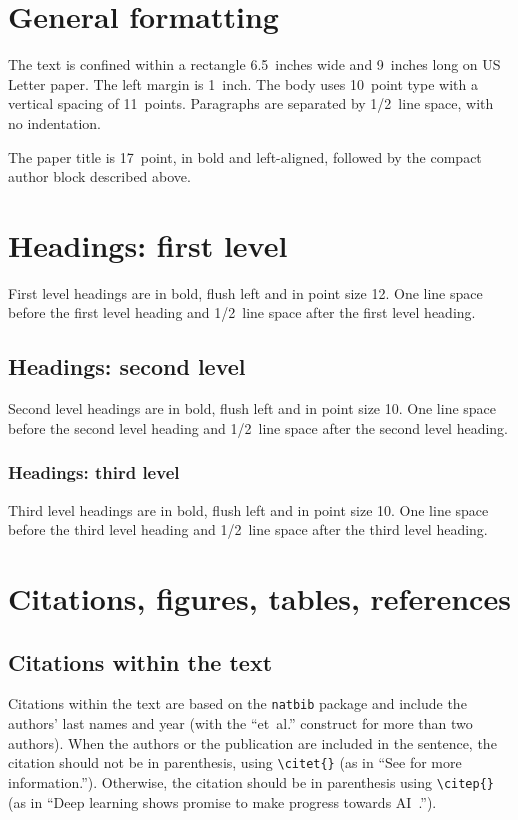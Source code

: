 \documentclass[10pt]{article} %
\begin{document}
\section{General formatting}
\label{gen_inst}

The text is confined within a rectangle 6.5~inches wide and
9~inches long on US Letter paper. The left margin is 1~inch.
The body uses 10~point type with a vertical spacing of 11~points.
Paragraphs are separated by 1/2~line space, with no indentation.

The paper title is 17~point, in bold and left-aligned, followed by the
compact author block described above.

\section{Headings: first level}
\label{headings}

First level headings are in bold,
flush left and in point size 12. One line space before the first level
heading and 1/2~line space after the first level heading.

\subsection{Headings: second level}

Second level headings are in bold,
flush left and in point size 10. One line space before the second level
heading and 1/2~line space after the second level heading.

\subsubsection{Headings: third level}

Third level headings are in bold,
flush left and in point size 10. One line space before the third level
heading and 1/2~line space after the third level heading.

\section{Citations, figures, tables, references}
\label{others}

\subsection{Citations within the text}

Citations within the text are based on the \texttt{natbib} package
and include the authors' last names and year (with the ``et~al.'' construct
for more than two authors). When the authors or the publication are
included in the sentence, the citation should not be in parenthesis, using \verb|\citet{}| (as
in ``See \citet{Hinton06} for more information.''). Otherwise, the citation
should be in parenthesis using \verb|\citep{}| (as in ``Deep learning shows promise to make progress
towards AI~\citep{Bengio+chapter2007}.'').
\end{document}
